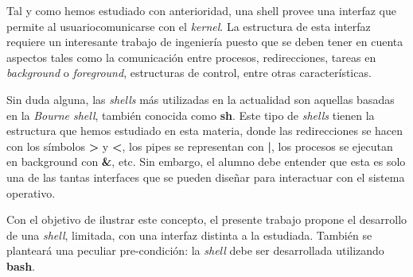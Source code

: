 Tal y como hemos estudiado con anterioridad, una shell provee una interfaz que permite al usuariocomunicarse con el \textit{kernel}. La estructura de esta interfaz requiere un interesante trabajo de ingeniería puesto que se deben tener en cuenta aspectos tales como la comunicación entre procesos, redirecciones, tareas en \textit{background} o \textit{foreground}, estructuras de control, entre otras características.

Sin duda alguna, las \textit{shells} más utilizadas en la actualidad son aquellas basadas en la \textit{Bourne shell}, también conocida como \textbf{sh}. Este tipo de \textit{shells} tienen la estructura que hemos estudiado en esta materia, donde las redirecciones se hacen con los símbolos \textbf{>} y \textbf{<}, los pipes se representan con \textbf{|}, los procesos se ejecutan en background con \textbf{\&}, etc. Sin embargo, el alumno debe entender que esta es solo una de las tantas interfaces que se pueden diseñar para interactuar con el sistema operativo.

Con el objetivo de ilustrar este concepto, el presente trabajo propone el desarrollo de una \textit{shell}, limitada, con una interfaz distinta a la estudiada. También se planteará una peculiar pre-condición: la \textit{shell} debe ser desarrollada utilizando \textbf{bash}.




